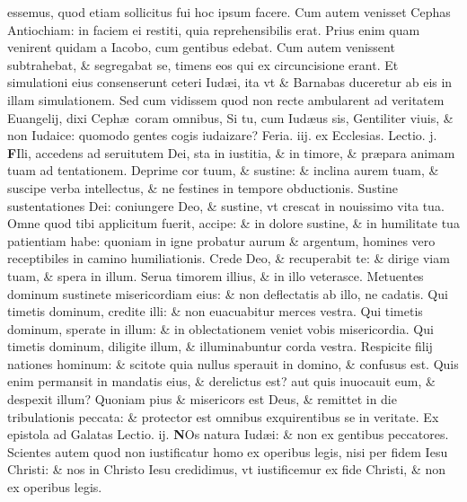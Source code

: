 \documentclass[a5paper,10pt]{book}
\def\leftmarginnote{%
	\lrmarginnote{\hskip -\marginparsep \hskip -6.5em}}
\def\rightmarginnote{%
	\lrmarginnote{\hskip\columnwidth \hskip -1em}}
\def\ae{æ}
\begin{document}
\begin{multicols*}{2}
essemus, quod etiam sollicitus fui hoc ipsum facere.
Cum autem venisset Cephas Antiochiam: in faciem ei restiti, quia reprehensibilis erat. Prius enim quam venirent quidam a Iacobo, cum gentibus edebat.
Cum autem venissent subtrahebat, \& segregabat se, timens eos qui ex circuncisione erant. Et simulationi eius consenserunt ceteri Iud\ae i, ita vt \& Barnabas duceretur ab eis in illam simulationem.
Sed cum vidissem quod non recte ambularent ad veritatem Euangelij, dixi Ceph\ae \ coram omnibus, Si tu, cum Iud\ae us sis, Gentiliter viuis, \& non Iudaice: quomodo gentes cogis iudaizare?
\newline {} \color{red} \hypertarget{TUE-PRIMA-VAGAN}{Feria. iij.} ex Ecclesias. Lectio. j. \color{black}
\vspace{-.25em}
\lettrine[lines=2]{\bfseries F}{}Ili,\leftmarginnote{\begin{flushright}ca. 2.\end{flushright}} accedens ad seruitutem Dei, sta in iustitia, \& in timore, \& pr\ae para animam tuam ad tentationem.
Deprime cor tuum, \& sustine: \& inclina aurem tuam, \& suscipe verba intellectus, \& ne festines in tempore obductionis.
Sustine sustentationes Dei: coniungere Deo, \& sustine, vt crescat in nouissimo vita tua. Omne quod tibi applicitum fuerit, accipe: \& in dolore sustine, \& in humilitate tua patientiam habe: quoniam in igne probatur aurum \& argentum, homines vero receptibiles in camino humiliationis.
Crede Deo, \& recuperabit te: \& dirige viam tuam, \& spera in illum. Serua timorem illius, \& in illo veterasce.
Metuentes dominum sustinete misericordiam eius: \& non deflectatis ab illo, ne cadatis. Qui timetis dominum, credite illi: \& non euacuabitur merces vestra.
Qui timetis dominum, sperate in illum: \& in oblectationem veniet vobis misericordia. Qui timetis dominum, diligite illum, \& illuminabuntur corda vestra.
Respicite filij nationes hominum: \& scitote quia nullus sperauit in domino, \& confusus est. Quis enim permansit in mandatis eius, \& derelictus est? aut quis inuocauit eum, \& despexit illum?
Quoniam pius \& misericors est Deus, \& remittet in die tribulationis peccata: \& protector est omnibus exquirentibus se in veritate.
\newline \color{red} Ex epistola ad Galatas \hfill Lectio. ij. \color{black}
\vspace{-.25em}
\lettrine[lines=2]{\bfseries \color{red} N}{}Os\rightmarginnote{ca. 2.} natura Iud\ae i: \& non ex gentibus peccatores.
Scientes autem quod non iustificatur homo ex operibus legis, nisi per fidem Iesu Christi: \& nos in Christo Iesu credidimus, vt iustificemur ex fide Christi, \& non ex operibus legis.

\end{multicols*}
\end{document}
